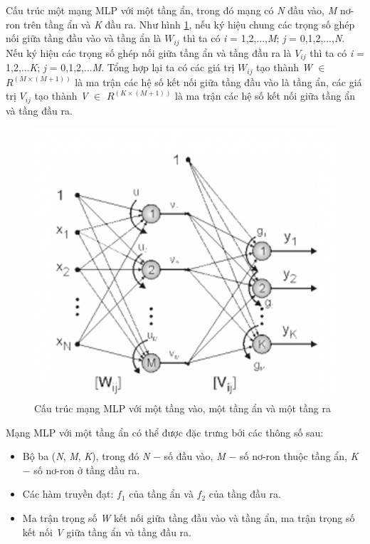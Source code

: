 Cấu trúc một mạng MLP với một tầng ẩn, trong đó mạng có \textit{N} đầu vào, \textit{M} nơ-ron trên tầng ẩn và \textit{K} đầu ra. Như hình \ref{fig:2-5}, nếu ký hiệu chung các trọng số ghép nối giữa tầng đầu vào và tầng ẩn là $W_{ij}$ thì ta có \textit{i} = 1,2,...,\textit{M}; \textit{j} = 0,1,2,...,\textit{N}. Nếu ký hiệu các trọng số ghép nối giữa tầng ẩn và tầng đầu ra là $V_{ij}$ thì ta có \textit{i} = 1,2,...\textit{K}; \textit{j} = 0,1,2,...\textit{M}. Tổng hợp lại ta có các giá trị $W_{ij}$ tạo thành \textit{W} $\in$ \textit{$R^{(M×(M+1))}$} là ma trận các hệ số kết nối giữa tầng đầu vào là tầng ẩn, các giá trị $V_{ij}$ tạo thành \textit{V} $\in$ \textit{$R^{(K×(M+1))}$} là ma trận các hệ số kết nối giữa tầng ẩn và tầng đầu ra.

\begin{figure}[H]
    \centering
    \includegraphics[scale=0.75]{./content/images/2-5.png}
    \caption{Cấu trúc mạng MLP với một tầng vào, một tầng ẩn và một tầng ra}
    \label{fig:2-5}
\end{figure}

Mạng MLP với một tầng ẩn có thể được đặc trưng bởi các thông số sau:
\begin{itemize}
\item Bộ ba (\textit{N}, \textit{M}, \textit{K}), trong đó \textit{N} − số đầu vào, \textit{M} − số nơ-ron thuộc tầng ẩn, \textit{K} − số nơ-ron ở tầng đầu ra.
\item Các hàm truyền đạt: $f_{1}$ của tầng ẩn và $f_{2}$ của tầng đầu ra.
\item Ma trận trọng số \textit{W} kết nối giữa tầng đầu vào và tầng ẩn, ma trận trọng số kết nối \textit{V} giữa tầng ẩn và tầng đầu ra.
\end{itemize}

